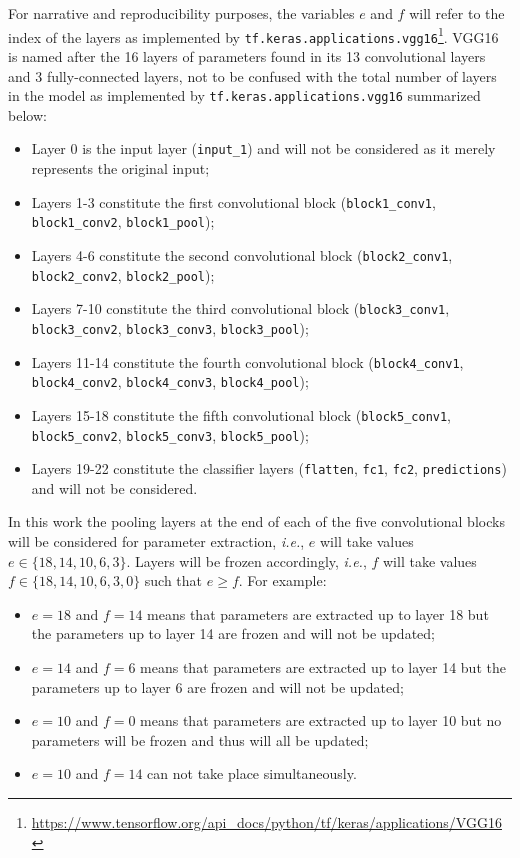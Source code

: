 For narrative and reproducibility purposes, the variables $e$ and $f$ will refer to the index of the layers as implemented by \verb|tf.keras.applications.vgg16|\footnote{\url{https://www.tensorflow.org/api_docs/python/tf/keras/applications/VGG16}}. VGG16 is named after the 16 layers of parameters found in its 13 convolutional layers and 3 fully-connected layers, not to be confused with the total number of layers in the model as implemented by \verb|tf.keras.applications.vgg16| summarized below:

\begin{itemize}
    \item Layer 0 is the input layer (\verb|input_1|) and will not be considered as it merely represents the original input;
    \item Layers 1-3 constitute the first convolutional block (\verb|block1_conv1|, \verb|block1_conv2|, \verb|block1_pool|);
    \item Layers 4-6 constitute the second convolutional block (\verb|block2_conv1|, \verb|block2_conv2|, \verb|block2_pool|);
    \item Layers 7-10 constitute the third convolutional block (\verb|block3_conv1|, \verb|block3_conv2|, \verb|block3_conv3|, \verb|block3_pool|);
    \item Layers 11-14 constitute the fourth convolutional block (\verb|block4_conv1|, \verb|block4_conv2|, \verb|block4_conv3|, \verb|block4_pool|);
    \item Layers 15-18 constitute the fifth convolutional block (\verb|block5_conv1|, \verb|block5_conv2|, \verb|block5_conv3|, \verb|block5_pool|);
    \item Layers 19-22 constitute the classifier layers (\verb|flatten|, \verb|fc1|, \verb|fc2|, \verb|predictions|) and will not be considered.
\end{itemize}

In this work the pooling layers at the end of each of the five convolutional blocks will be considered for parameter extraction, \textit{i.e.}, $e$ will take values $e \in \{18, 14, 10, 6, 3\}$. Layers will be frozen accordingly, \textit{i.e.}, $f$ will take values $f \in \{18, 14, 10, 6, 3, 0\}$ such that $e \geq f$. For example:

\begin{itemize}
    \item $e = 18$ and $f = 14$ means that parameters are extracted up to layer 18 but the parameters up to layer 14 are frozen and will not be updated;
    \item $e = 14$ and $f = 6$ means that parameters are extracted up to layer 14 but the parameters up to layer 6 are frozen and will not be updated;
    \item $e = 10$ and $f = 0$ means that parameters are extracted up to layer 10 but no parameters will be frozen and thus will all be updated;
    \item $e = 10$ and $f = 14$ can not take place simultaneously.
\end{itemize}

